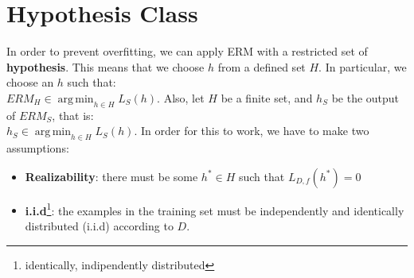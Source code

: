 \documentclass[12pt, a4paper, english]{report}
\DeclareMathOperator*{\argmin}{arg\,min}
\begin{document}
\section{Hypothesis Class}
In order to prevent overfitting, we can apply ERM with a restricted set of \textbf{hypothesis}.\newline
This means that we choose $h$ from a defined set $H$.\newline
In particular, we choose an $h$ such that:\\
$ERM_{H} \in \argmin_{h \in H} L_{S}(h)$. \newline
Also, let $H$ be a finite set, and $h_{S}$ be the output of $ERM_{S}$, that is:\\
$h_{S} \in \argmin_{h \in H} L_{S}(h)$.\newline
In order for this to work, we have to make two assumptions:
\begin{itemize}
    \item \textbf{Realizability}: there must be some $h^{*} \in H$ such that $L_{D,f}(h^{*}) = 0$
    \item \textbf{i.i.d}\footnote{identically, indipendently distributed}: the examples in the training set must be independently and identically distributed (i.i.d) according to $D$.
\end{itemize}
\end{document}
